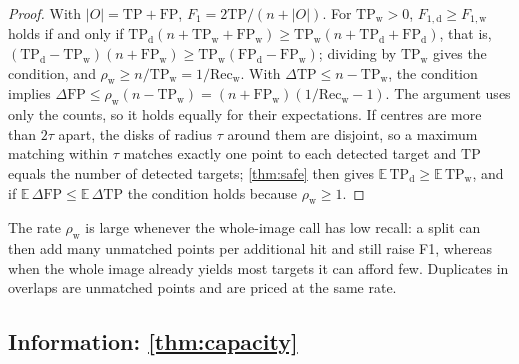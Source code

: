 \begin{proof}
With $|O| = \mathrm{TP} + \mathrm{FP}$, $F_1 = 2\mathrm{TP}/(n + |O|)$. For $\mathrm{TP}_{\mathrm{w}} > 0$, $F_{1,\mathrm{d}} \ge F_{1,\mathrm{w}}$ holds if and only if $\mathrm{TP}_{\mathrm{d}}(n + \mathrm{TP}_{\mathrm{w}} + \mathrm{FP}_{\mathrm{w}}) \ge \mathrm{TP}_{\mathrm{w}}(n + \mathrm{TP}_{\mathrm{d}} + \mathrm{FP}_{\mathrm{d}})$, that is, $(\mathrm{TP}_{\mathrm{d}} - \mathrm{TP}_{\mathrm{w}})(n + \mathrm{FP}_{\mathrm{w}}) \ge \mathrm{TP}_{\mathrm{w}}(\mathrm{FP}_{\mathrm{d}} - \mathrm{FP}_{\mathrm{w}})$; dividing by $\mathrm{TP}_{\mathrm{w}}$ gives the condition, and $\rho_{\mathrm{w}} \ge n/\mathrm{TP}_{\mathrm{w}} = 1/\mathrm{Rec}_{\mathrm{w}}$. With $\Delta\mathrm{TP} \le n - \mathrm{TP}_{\mathrm{w}}$, the condition implies $\Delta\mathrm{FP} \le \rho_{\mathrm{w}}(n - \mathrm{TP}_{\mathrm{w}}) = (n + \mathrm{FP}_{\mathrm{w}})(1/\mathrm{Rec}_{\mathrm{w}} - 1)$. The argument uses only the counts, so it holds equally for their expectations. If centres are more than $2\tau$ apart, the disks of radius $\tau$ around them are disjoint, so a maximum matching within $\tau$ matches exactly one point to each detected target and $\mathrm{TP}$ equals the number of detected targets; \cref{thm:safe} then gives $\mathbb{E}\,\mathrm{TP}_{\mathrm{d}} \ge \mathbb{E}\,\mathrm{TP}_{\mathrm{w}}$, and if $\mathbb{E}\,\Delta\mathrm{FP} \le \mathbb{E}\,\Delta\mathrm{TP}$ the condition holds because $\rho_{\mathrm{w}} \ge 1$.
\end{proof}

The rate $\rho_{\mathrm{w}}$ is large whenever the whole-image call has low recall: a split can then add many unmatched points per additional hit and still raise F1, whereas when the whole image already yields most targets it can afford few. Duplicates in overlaps are unmatched points and are priced at the same rate.

\subsection{Information: \cref{thm:capacity}}
\label{sec:proofs-bits}

